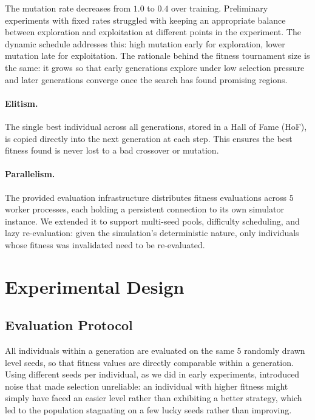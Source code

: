 \documentclass[runningheads]{llncs}
\begin{document}
The mutation rate decreases from $1.0$ to $0.4$ over training. Preliminary experiments with fixed rates struggled with keeping an appropriate balance between exploration and exploitation at different points in the experiment. The dynamic schedule addresses this: high mutation early for exploration, lower mutation late for exploitation. The rationale behind the fitness tournament size is the same: it grows so that early generations explore under low selection pressure and later generations converge once the search has found promising regions.

\paragraph{Elitism.}
The single best individual across all generations, stored in a Hall of Fame (HoF), is copied directly into the next generation at each step. This ensures the best fitness found is never lost to a bad crossover or mutation.

\paragraph{Parallelism.}
The provided evaluation infrastructure distributes fitness evaluations across $5$ worker processes, each holding a persistent connection to its own simulator instance. We extended it to support multi-seed pools, difficulty scheduling, and lazy re-evaluation: given the simulation's deterministic nature, only individuals whose fitness was invalidated need to be re-evaluated.


\section{Experimental Design}
\label{sec:exp}

\subsection{Evaluation Protocol}

All individuals within a generation are evaluated on the same $5$ randomly drawn level seeds, so that fitness values are directly comparable within a generation. Using different seeds per individual, as we did in early experiments, introduced noise that made selection unreliable: an individual with higher fitness might simply have faced an easier level rather than exhibiting a better strategy, which led to the population stagnating on a few lucky seeds rather than improving.
\end{document}
